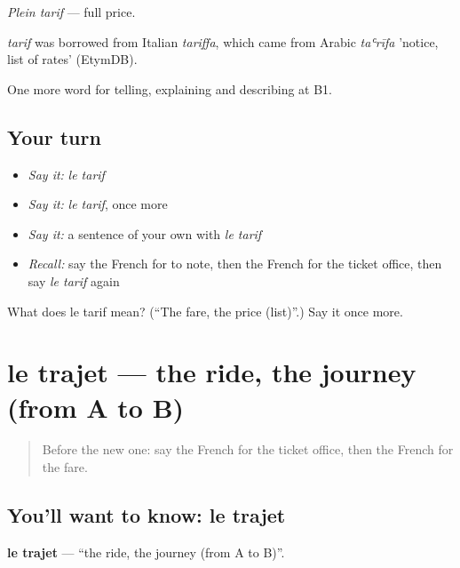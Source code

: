 \emph{Plein tarif} — full price.

\begin{cousinweb}
\emph{tarif} was borrowed from Italian \emph{tariffa}, which came from Arabic \emph{taʿrīfa} 'notice, list of rates' (EtymDB).
\end{cousinweb}

\begin{grammarlens}[title={What you've built}]
One more word for telling, explaining and describing at B1.
\end{grammarlens}

\subsection*{Your turn}
\begin{itemize}
\raggedright
  \item \emph{Say it:} \emph{le tarif}
  \item \emph{Say it:} \emph{le tarif}, once more
  \item \emph{Say it:} a sentence of your own with \emph{le tarif}
  \item \emph{Recall:} say the French for to note, then the French for the ticket office, then say \emph{le tarif} again
\end{itemize}

\begin{tcolorbox}[breakable,colback=teal!4,colframe=teal!35!black,title={Before you move on}]
What does le tarif mean? (\textquotedblleft{}The fare, the price (list)\textquotedblright{}.) Say it once more.
\end{tcolorbox}
\section[le trajet]{le trajet — the ride, the journey (from A to B)}

\label{lesson:FR-C412-trajet}



\begin{quote}
Before the new one: say the French for the ticket office, then the French for the fare.
\end{quote}

\subsection*{You'll want to know: le trajet}
\textbf{le trajet} — \textquotedblleft{}the ride, the journey (from A to B)\textquotedblright{}.

